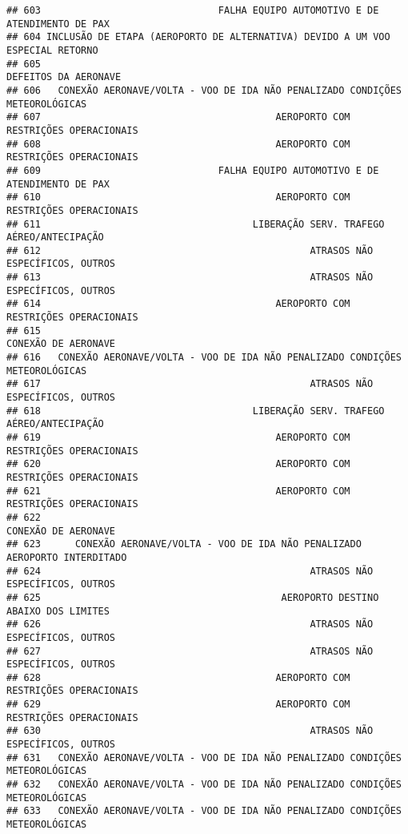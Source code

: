 \documentclass[
]{article}
\begin{document}
\begin{verbatim}
## 603                               FALHA EQUIPO AUTOMOTIVO E DE ATENDIMENTO DE PAX
## 604 INCLUSÃO DE ETAPA (AEROPORTO DE ALTERNATIVA) DEVIDO A UM VOO ESPECIAL RETORNO
## 605                                                          DEFEITOS DA AERONAVE
## 606   CONEXÃO AERONAVE/VOLTA - VOO DE IDA NÃO PENALIZADO CONDIÇÕES METEOROLÓGICAS
## 607                                         AEROPORTO COM RESTRIÇÕES OPERACIONAIS
## 608                                         AEROPORTO COM RESTRIÇÕES OPERACIONAIS
## 609                               FALHA EQUIPO AUTOMOTIVO E DE ATENDIMENTO DE PAX
## 610                                         AEROPORTO COM RESTRIÇÕES OPERACIONAIS
## 611                                     LIBERAÇÃO SERV. TRAFEGO AÉREO/ANTECIPAÇÃO
## 612                                               ATRASOS NÃO ESPECÍFICOS, OUTROS
## 613                                               ATRASOS NÃO ESPECÍFICOS, OUTROS
## 614                                         AEROPORTO COM RESTRIÇÕES OPERACIONAIS
## 615                                                           CONEXÃO DE AERONAVE
## 616   CONEXÃO AERONAVE/VOLTA - VOO DE IDA NÃO PENALIZADO CONDIÇÕES METEOROLÓGICAS
## 617                                               ATRASOS NÃO ESPECÍFICOS, OUTROS
## 618                                     LIBERAÇÃO SERV. TRAFEGO AÉREO/ANTECIPAÇÃO
## 619                                         AEROPORTO COM RESTRIÇÕES OPERACIONAIS
## 620                                         AEROPORTO COM RESTRIÇÕES OPERACIONAIS
## 621                                         AEROPORTO COM RESTRIÇÕES OPERACIONAIS
## 622                                                           CONEXÃO DE AERONAVE
## 623      CONEXÃO AERONAVE/VOLTA - VOO DE IDA NÃO PENALIZADO AEROPORTO INTERDITADO
## 624                                               ATRASOS NÃO ESPECÍFICOS, OUTROS
## 625                                          AEROPORTO DESTINO ABAIXO DOS LIMITES
## 626                                               ATRASOS NÃO ESPECÍFICOS, OUTROS
## 627                                               ATRASOS NÃO ESPECÍFICOS, OUTROS
## 628                                         AEROPORTO COM RESTRIÇÕES OPERACIONAIS
## 629                                         AEROPORTO COM RESTRIÇÕES OPERACIONAIS
## 630                                               ATRASOS NÃO ESPECÍFICOS, OUTROS
## 631   CONEXÃO AERONAVE/VOLTA - VOO DE IDA NÃO PENALIZADO CONDIÇÕES METEOROLÓGICAS
## 632   CONEXÃO AERONAVE/VOLTA - VOO DE IDA NÃO PENALIZADO CONDIÇÕES METEOROLÓGICAS
## 633   CONEXÃO AERONAVE/VOLTA - VOO DE IDA NÃO PENALIZADO CONDIÇÕES METEOROLÓGICAS

\end{verbatim}
\end{document}

